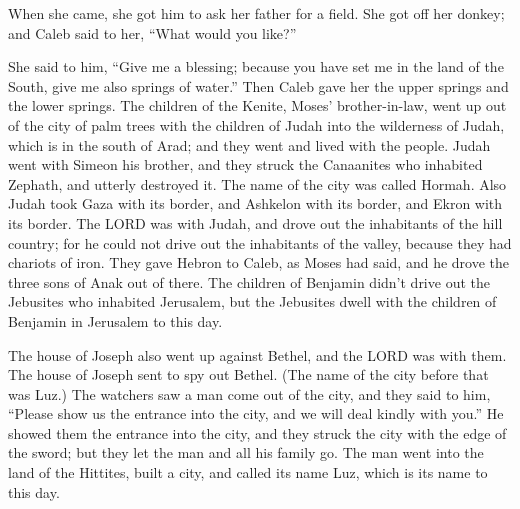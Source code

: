  When she came, she got him to ask her father for a
field. She got off her donkey; and Caleb said to her, ``What would you
like?''

 She said to him, ``Give me a blessing; because you have
set me in the land of the South, give me also springs of water.'' Then
Caleb gave her the upper springs and the lower springs. 
The children of the Kenite, Moses' brother-in-law, went up out of the
city of palm trees with the children of Judah into the wilderness of
Judah, which is in the south of Arad; and they went and lived with the
people.  Judah went with Simeon his brother, and they
struck the Canaanites who inhabited Zephath, and utterly destroyed it.
The name of the city was called Hormah.  Also Judah took
Gaza with its border, and Ashkelon with its border, and Ekron with its
border.  The LORD was with Judah, and drove out the
inhabitants of the hill country; for he could not drive out the
inhabitants of the valley, because they had chariots of iron.
 They gave Hebron to Caleb, as Moses had said, and he
drove the three sons of Anak out of there.  The children
of Benjamin didn't drive out the Jebusites who inhabited Jerusalem, but
the Jebusites dwell with the children of Benjamin in Jerusalem to this
day.

 The house of Joseph also went up against Bethel, and the
LORD was with them.  The house of Joseph sent to spy out
Bethel. (The name of the city before that was Luz.)  The
watchers saw a man come out of the city, and they said to him, ``Please
show us the entrance into the city, and we will deal kindly with you.''
 He showed them the entrance into the city, and they
struck the city with the edge of the sword; but they let the man and all
his family go.  The man went into the land of the
Hittites, built a city, and called its name Luz, which is its name to
this day.

